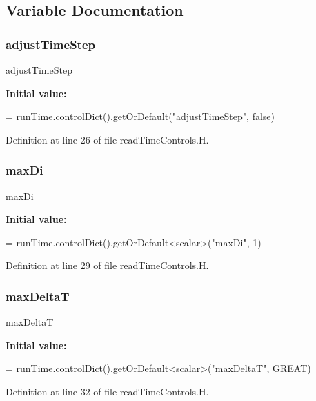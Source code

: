 \subsection{Variable Documentation}
\mbox{\label{readTimeControls_8H_aed3f9b837a567b5ce04f1f23ad13e2a2}} 
\subsubsection{\texorpdfstring{adjust\+Time\+Step}{adjustTimeStep}}
{\footnotesize\ttfamily adjust\+Time\+Step}

{\bfseries Initial value\+:}
\begin{DoxyCode}
=
    runTime.controlDict().getOrDefault(\textcolor{stringliteral}{"adjustTimeStep"}, \textcolor{keyword}{false})
\end{DoxyCode}


Definition at line 26 of file read\+Time\+Controls.\+H.

\mbox{\label{readTimeControls_8H_aa0b18cda8f98c1601aa30ea0f3ffe501}} 
\subsubsection{\texorpdfstring{max\+Di}{maxDi}}
{\footnotesize\ttfamily max\+Di}

{\bfseries Initial value\+:}
\begin{DoxyCode}
=
    runTime.controlDict().getOrDefault<scalar>(\textcolor{stringliteral}{"maxDi"}, 1)
\end{DoxyCode}


Definition at line 29 of file read\+Time\+Controls.\+H.

\mbox{\label{readTimeControls_8H_abbfba7a2061301dd658470d7811331c8}} 
\subsubsection{\texorpdfstring{max\+DeltaT}{maxDeltaT}}
{\footnotesize\ttfamily max\+DeltaT}

{\bfseries Initial value\+:}
\begin{DoxyCode}
=
    runTime.controlDict().getOrDefault<scalar>(\textcolor{stringliteral}{"maxDeltaT"}, GREAT)
\end{DoxyCode}


Definition at line 32 of file read\+Time\+Controls.\+H.

